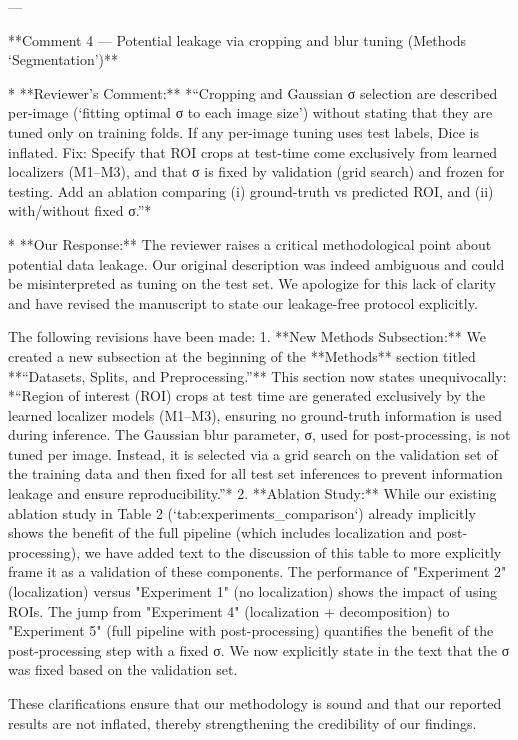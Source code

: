 ---

**Comment 4 — Potential leakage via cropping and blur tuning (Methods ‘Segmentation’)**

*   **Reviewer’s Comment:** *“Cropping and Gaussian σ selection are described per-image (‘fitting optimal σ to each image size’) without stating that they are tuned only on training folds. If any per-image tuning uses test labels, Dice is inflated. Fix: Specify that ROI crops at test-time come exclusively from learned localizers (M1–M3), and that σ is fixed by validation (grid search) and frozen for testing. Add an ablation comparing (i) ground-truth vs predicted ROI, and (ii) with/without fixed σ.”*

*   **Our Response:** The reviewer raises a critical methodological point about potential data leakage. Our original description was indeed ambiguous and could be misinterpreted as tuning on the test set. We apologize for this lack of clarity and have revised the manuscript to state our leakage-free protocol explicitly.

    The following revisions have been made:
    1.  **New Methods Subsection:** We created a new subsection at the beginning of the **Methods** section titled **“Datasets, Splits, and Preprocessing.”** This section now states unequivocally: *“Region of interest (ROI) crops at test time are generated exclusively by the learned localizer models (M1–M3), ensuring no ground-truth information is used during inference. The Gaussian blur parameter, σ, used for post-processing, is not tuned per image. Instead, it is selected via a grid search on the validation set of the training data and then fixed for all test set inferences to prevent information leakage and ensure reproducibility.”*
    2.  **Ablation Study:** While our existing ablation study in Table 2 (`tab:experiments_comparison`) already implicitly shows the benefit of the full pipeline (which includes localization and post-processing), we have added text to the discussion of this table to more explicitly frame it as a validation of these components. The performance of "Experiment 2" (localization) versus "Experiment 1" (no localization) shows the impact of using ROIs. The jump from "Experiment 4" (localization + decomposition) to "Experiment 5" (full pipeline with post-processing) quantifies the benefit of the post-processing step with a fixed σ. We now explicitly state in the text that the σ was fixed based on the validation set.

    These clarifications ensure that our methodology is sound and that our reported results are not inflated, thereby strengthening the credibility of our findings.

